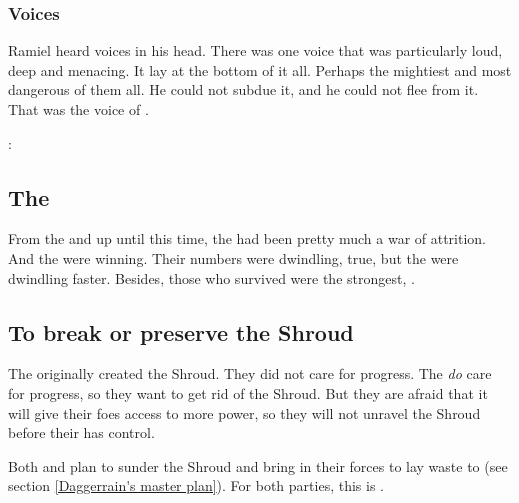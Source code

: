 \subsubsection{Voices}
Ramiel heard voices in his head. 
There was one voice that was particularly loud, deep and menacing.
It lay at the bottom of it all.
Perhaps the mightiest and most dangerous of them all. 
He could not subdue it, and he could not flee from it. 
That was the voice of \Nexagglachel. 

\begin{prose}
  \Nexagglachel:
\end{prose}
 







\subsection{The \Feud}
From the \Shrouding{} and up until this time, the \feud{} had been pretty much a war of attrition. 
And the \resphain{} were winning. 
Their numbers were dwindling, true, but the \dragons{} were dwindling faster. 
Besides, those \resphain{} who survived were the strongest, . 







\subsection{To break or preserve the Shroud}
The \dragons{} originally created the Shroud. They did not care for progress. The \resphain{} \emph{do} care for progress, so they want to get rid of the Shroud. But they are afraid that it will give their \draconic{} foes access to more \xsic{} power, so they will not unravel the Shroud before their \matrix{} has control. 

Both \Daggerrain{} and \Secherdamon{} plan to sunder the Shroud and bring in their forces to lay waste to \Miith{} (see section \ref{Daggerrain's master plan}). For both parties, this is .

